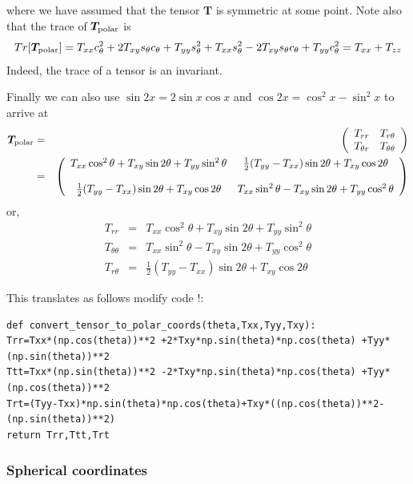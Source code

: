 \documentclass[a4paper,12pt]{article}
\newcommand{\nn}{\nonumber}
\begin{document}
where we have assumed that the tensor ${\bm T}$ is symmetric at some point.
Note also that the trace of ${\bm T}_{\rm polar}$ is 
\[
Tr[{\bm T}_{\rm polar}] = T_{xx} c^2_\theta  + 2T_{xy} s_\theta c_\theta + T_{yy} s^2_\theta
+ T_{xx} s^2_\theta - 2T_{xy} s_\theta c_\theta + T_{yy} c^2_\theta 
= T_{xx} + T_{zz}
\]
Indeed, the trace of a tensor is an invariant.

Finally we can also use $\sin 2x = 2 \sin x \cos x$ and $\cos 2x = \cos^2 x -\sin^2 x$ 
to arrive at
\begin{eqnarray}
{\bm T}_{\rm polar}
&=&
\left(\begin{array}{cc}
T_{rr}       & T_{r\theta}     \\ 
T_{\theta r} & T_{\theta\theta}
\end{array}\right) \nn\\
&=& 
\left(\begin{array}{cc}
T_{xx} \cos^2 \theta  + T_{xy} \sin 2\theta + T_{yy} \sin^2 \theta & 
\frac12(T_{yy}-T_{xx}) \sin 2\theta  + T_{xy} \cos 2\theta    \\ 
\\
\frac12 (T_{yy}-T_{xx}) \sin 2\theta  + T_{xy} \cos 2\theta   &  
T_{xx} \sin^2 \theta - T_{xy} \sin 2\theta + T_{yy} \cos^2 \theta  
\end{array}
\right) \nn
\end{eqnarray}
or,
\begin{eqnarray}
T_{rr} &=& T_{xx} \cos^2 \theta  + T_{xy} \sin 2\theta + T_{yy} \sin^2 \theta \\ 
T_{\theta\theta} &=& T_{xx} \sin^2 \theta - T_{xy} \sin 2\theta + T_{yy} \cos^2 \theta \\
T_{r\theta} &=& \frac12(T_{yy}-T_{xx}) \sin 2\theta  + T_{xy} \cos 2\theta 
\end{eqnarray}


This translates as follows {\color{red} modify code !}:
\begin{lstlisting}
def convert_tensor_to_polar_coords(theta,Txx,Tyy,Txy):
Trr=Txx*(np.cos(theta))**2 +2*Txy*np.sin(theta)*np.cos(theta) +Tyy*(np.sin(theta))**2
Ttt=Txx*(np.sin(theta))**2 -2*Txy*np.sin(theta)*np.cos(theta) +Tyy*(np.cos(theta))**2
Trt=(Tyy-Txx)*np.sin(theta)*np.cos(theta)+Txy*((np.cos(theta))**2-(np.sin(theta))**2)
return Trr,Ttt,Trt
\end{lstlisting}


\newpage
\subsubsection{Spherical coordinates}
\end{document}
